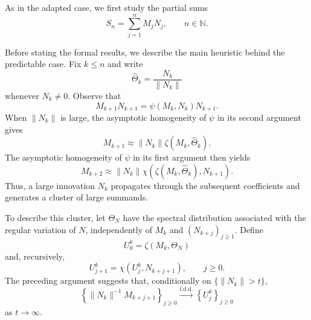 \documentclass[preprint,12pt]{elsarticle}
\theoremstyle{definition}
\theoremstyle{remark}
\newcommand{\Mbf}{{ M}}
\newcommand{\Ubf}{{ U}}
\newcommand{\Nbf}{{ N}}
\newcommand{\Sbf}{{ S}}
\newcommand{\1}{{\mathbf 1}}
\numberwithin{equation}{section}
\begin{document}
  As in the adapted case, we first study the partial sums
  \begin{equation*}
    \Sbf_n=\sum_{j=1}^n\Mbf_j\Nbf_j,
    \qquad n\in\mathbb{N}.
  \end{equation*}

  Before stating the formal results, we describe the main heuristic behind
  the predictable case. Fix $k\leq n$ and write
  \begin{equation*}
    \widehat{\Theta}_k
    =
    \frac{\Nbf_k}{\|\Nbf_k\|}
  \end{equation*}
  whenever $\Nbf_k\neq0$. Observe that
  \[
    \Mbf_{k+1}\Nbf_{k+1}
    =
    \psi(\Mbf_k,\Nbf_k)\Nbf_{k+1}.
  \]
  When $\|\Nbf_k\|$ is large, the asymptotic homogeneity of $\psi$ in its
  second argument gives
  \begin{equation*}
    \Mbf_{k+1}
    \approx
    \|\Nbf_k\|
    \zeta(\Mbf_k,\widehat{\Theta}_k).
  \end{equation*}
  The asymptotic homogeneity of $\psi$ in its first argument then yields
  \begin{equation*}
    \Mbf_{k+2}
    \approx
    \|\Nbf_k\|
    \chi\left(
      \zeta(\Mbf_k,\widehat{\Theta}_k),
      \Nbf_{k+1}
    \right).
  \end{equation*}
  Thus, a large innovation $\Nbf_k$ propagates through the subsequent
  coefficients and generates a cluster of large summands.

  To describe this cluster, let $\Theta_\Nbf$ have the spectral distribution
  associated with the regular variation of $\Nbf$, independently of
  $\Mbf_k$ and $(\Nbf_{k+j})_{j\geq1}$. Define
  \begin{equation*}
    \Ubf_0^k
    =
    \zeta(\Mbf_k,\Theta_\Nbf)
  \end{equation*}
  and, recursively,
  \begin{equation*}
    \Ubf_{j+1}^k
    =
    \chi\left(\Ubf_j^k,\Nbf_{k+j+1}\right),
    \qquad j\geq0.
  \end{equation*}
  The preceding argument suggests that, conditionally on
  $\{\|\Nbf_k\|>t\}$,
  \begin{equation*}
    \left\{
      \|\Nbf_k\|^{-1}\Mbf_{k+j+1}
    \right\}_{j\geq0}
    \xrightarrow{\mathrm{f.d.d.}}
    \left\{
      \Ubf_j^k
    \right\}_{j\geq0}
  \end{equation*}
  as $t\to\infty$.
\end{document}
